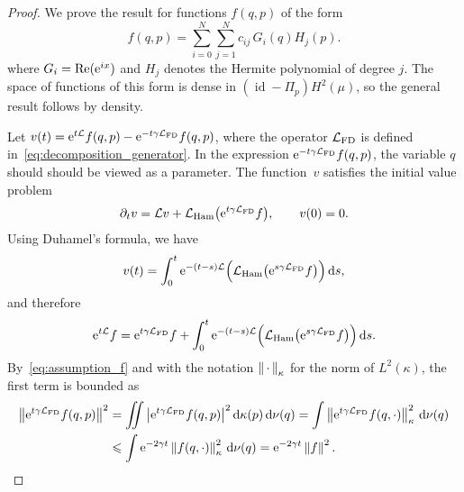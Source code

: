 \documentclass[11pt,a4paper]{article}
\DeclareMathOperator{\id}{id}
\newcommand{\e}{\mathrm{e}}
\newcommand{\dummy}{\,\cdot\,}
\renewcommand{\d}{\mathrm d}
\theoremstyle{plain}
\numberwithin{equation}{section}
\renewcommand{\leq}{\leqslant}
\begin{document}
\begin{proof}
    We prove the result for functions $f(q, p)$ of the form
    \begin{equation}
        \label{eq:expansion}
        f(q, p) = \sum_{i=0}^{N} \sum_{j=1}^{N} c_{ij} \, G_i(q) H_j(p).
    \end{equation}
    where $G_i = {\rm Re}(\e^{ix})$ and $H_j$ denotes the Hermite polynomial of degree $j$.
    The space of functions of this form is dense in $(\id - \Pi_p) H^2(\mu)$,
    so the general result follows by density.

    Let $v(t) = \e^{t \mathcal L} f(q, p) - \e^{- t \gamma \mathcal L_{\rm FD}} f(q, p)$,
    where the operator $\mathcal L_{\rm FD}$ is defined in~\eqref{eq:decomposition_generator}.
    In the expression $\e^{- t \gamma \mathcal L_{\rm FD}} f(q, p)$,
    the variable $q$ should should be viewed as a parameter.
    The function~$v$ satisfies the initial value problem
    \[
        \partial_t v = \mathcal L v +  \mathcal L_{\rm Ham} \bigl(\e^{t \gamma \mathcal L_{\rm FD}} f\bigr), \qquad v(0) = 0.
    \]
    Using Duhamel's formula, we have
    \[
        v(t) = \int_{0}^{t} \e^{- (t-s) \mathcal L}  \Bigl( \mathcal L_{\rm Ham} \bigl(\e^{s \gamma \mathcal L_{\rm FD}} f\bigr) \Bigr) \, \d s,
    \]
    and therefore
    \begin{equation}
        \label{eq:intermediate_decay_correlation}
        \e^{t \mathcal L} f =  \e^{t \gamma \mathcal L_{\rm FD}} f
        + \int_{0}^{t} \e^{- (t-s) \mathcal L}  \Bigl( \mathcal L_{\rm Ham} \bigl(\e^{s \gamma \mathcal L_{\rm FD}} f\bigr) \Bigr) \, \d s.
    \end{equation}
    By~\eqref{eq:assumption_f} and with the notation $\norm{\dummy}[\kappa]$ for the norm of $L^2(\kappa)$,
    the first term is bounded as
    \begin{align}
        \notag
        \norm{\e^{t \gamma \mathcal L_{\rm FD}} f(q, p)}^2
        &= \int \!\!\!\! \int  \abs{\e^{t \gamma \mathcal L_{\rm FD}} f(q, p) }^2 \d \kappa(p) \,\d \nu(q)
        = \int \norm{\e^{t \gamma \mathcal L_{\rm FD}} f(q, \cdot) }[\kappa]^2 \, \d \nu(q) \\
        \label{eq:bound_first_term}
        &\leq \int \e^{-2 \gamma t} \norm{f(q, \cdot) }[\kappa]^2 \, \d \nu(q) = \e^{-2\gamma t} \norm{f}^2.

\end{align}
\end{proof}
\end{document}
